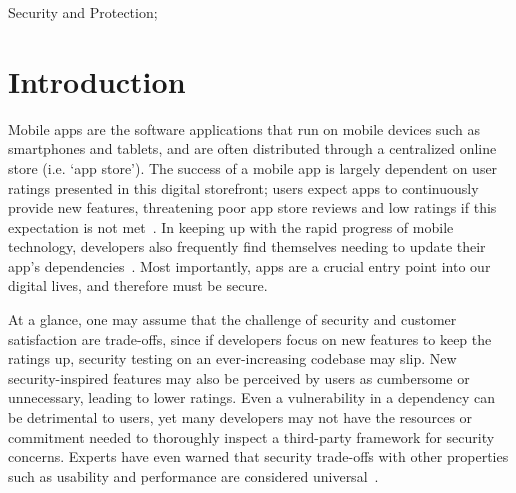 \documentclass{sig-alternate-05-2015}
\newcommand{\todo}[1]{\textcolor{cyan}{\textbf{[#1]}}}
\newcommand{\sam}[1]{\textcolor{magenta}{{\it [Sam says: #1]}}}
\begin{document}

Security and Protection;



\section{Introduction}




Mobile apps are the software applications that run on mobile devices such as smartphones and tablets, and are often distributed through a centralized online store (i.e. `app store'). The success of a mobile app is largely dependent on user ratings presented in this digital storefront; users expect apps to continuously provide new features, threatening poor app store reviews and low ratings if this expectation is not met~\cite{Khalid2014}. In keeping up with the rapid progress of mobile technology, developers also frequently find themselves needing to update their app's dependencies~\cite{Syer2013}. Most importantly, apps are a crucial entry point into our digital lives, and therefore must be secure. %

At a glance, one may assume that the challenge of security and customer satisfaction are trade-offs, since if developers focus on new features to keep the ratings up, security testing on an ever-increasing codebase may slip. New security-inspired features may also be perceived by users as cumbersome or unnecessary, leading to lower ratings. Even a vulnerability in a dependency can be detrimental to users, yet many developers may not have the resources or commitment needed to thoroughly inspect a third-party framework for security concerns. Experts have even warned that security trade-offs with other properties such as usability and performance are considered universal~\cite{McGrawBSS}.
\end{document}
